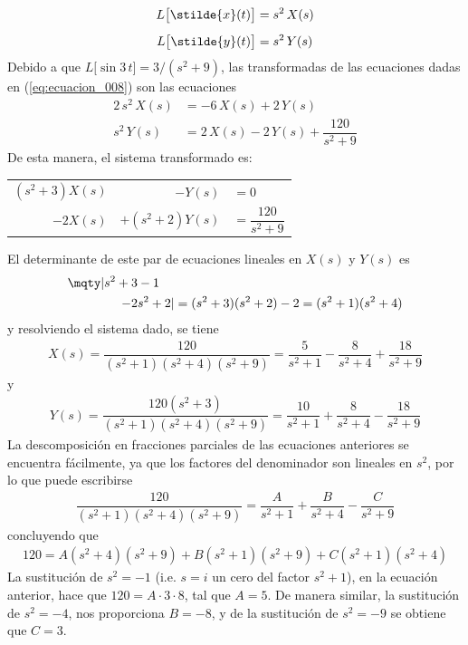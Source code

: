 \begin{align*}
L \big[\stilde{x} (t)\big] &= s^{2} \, X(s) \\[0.5em]
L \big[\stilde{y} (t)\big] &= s^{2} \, Y(s)
\end{align*}
Debido a que $L \big[\sin 3 \, t \big] = 3 / (s^{2} + 9)$, las transformadas de las ecuaciones dadas en (\ref{eq:ecuacion_008}) son las ecuaciones
\begin{align*}
2 \, s^{2} \, X(s) &= - 6 \, X(s) + 2 \, Y(s) \\[0.5em]
s^{2} \, Y(s) &= 2 \, X(s) - 2 \, Y(s) + \dfrac{120}{s^{2} + 9} 
\end{align*}
De esta manera, el sistema transformado es:
\begin{center}
\begin{tabular}{r r l}
$(s^{2} + 3) X(s)$ & $-Y(s)$ & $=0$ \\
$-2X(s)$ & $+(s^{2} + 2) Y(s)$ & $=\dfrac{120}{s^{2}+9}$ 
\end{tabular}
\end{center}
El determinante de este par de ecuaciones lineales en $X(s)$ y $Y(s)$ es
\begin{align*}
\mqty|
s^{2} + 3 & -1 \\
-2 & s^{2} + 2
|
 = (s^{2} + 3)(s^{2} + 2) - 2 = (s^{2} + 1) (s^{2} + 4 )
\end{align*}
y resolviendo el sistema dado, se tiene
\begin{align*}
X(s) = \dfrac{120}{(s^{2} + 1)(s^{2} + 4)(s^{2} + 9)} = \dfrac{5}{s^{2} + 1} - \dfrac{8}{s^{2} + 4} + \dfrac{18}{s^{2} + 9}
\end{align*}
y
\begin{align*}
Y(s) = \dfrac{120 (s^{2} + 3)}{(s^{2} + 1)(s^{2} + 4)(s^{2} + 9)} = \dfrac{10}{s^{2} + 1} + \dfrac{8}{s^{2} + 4} - \dfrac{18}{s^{2} + 9}
\end{align*}
La descomposición en fracciones parciales de las ecuaciones anteriores se encuentra fácilmente, ya que los factores del denominador son lineales en $s^{2}$, por lo que puede escribirse
\begin{align*}
\dfrac{120}{(s^{2} + 1)(s^{2} + 4)(s^{2} + 9)} = \dfrac{A}{s^{2} + 1} + \dfrac{B}{s^{2} + 4} - \dfrac{C}{s^{2} + 9}
\end{align*}
concluyendo que
\begin{align*}
120 =  A(s^{2} + 4)(s^{2} + 9) + B(s^{2} + 1)(s^{2} + 9) + C(s^{2} + 1)(s^{2} + 4)
\end{align*}
La sustitución de $s^{2} = -1$ (i.e. $s = i$ un cero del factor $s^{2} + 1$), en la ecuación anterior, hace que $120 = A \cdot 3 \cdot 8$, tal que $A = 5$. De manera similar, la sustitución de $s^{2} = -4$, nos proporciona $B = -8$, y de la sustitución de $s^{2} = -9$ se obtiene que $C = 3$.
